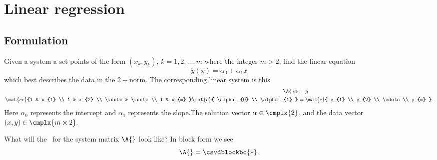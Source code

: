 \section{Linear regression}

\subsection{Formulation}
Given a system a set points of the form $(x_{k}, y_{k})$, $k=1,2,\dots,m$ where the integer $m>2$, find the linear equation
  \begin{equation}
    y(x) = \alpha_{0} + \alpha_{1}x
  \end{equation}
which best describes the data in the $2-$norm. The corresponding linear system is this
\begin{equation}
  \begin{split}
    \A{} \alpha &= y \\
    \mat{cc}{1 & x_{1}  \\ 1 & x_{2} \\ \vdots & \vdots \\ 1 & x_{m} }
    \mat{c}{ \alpha_{0} \\ \alpha_{1} } &=
    \mat{c}{ y_{1} \\ y_{2} \\ \vdots \\ y_{m} } .
  \label{eq:linear model}
  \end{split}
\end{equation}
Here $\alpha_{0}$ represents the intercept and $\alpha_{1}$ represents the slope.The solution vector $\alpha\in\cmplx{2}$, and the data vector $(x,y)\in\cmplx{m\times 2}$. 

What will the \asvd \ for the system matrix $\A{}$ look like? In block form we see
  \begin{equation}
    \A{} = \csvdblockbc{*} .
  \end{equation}



